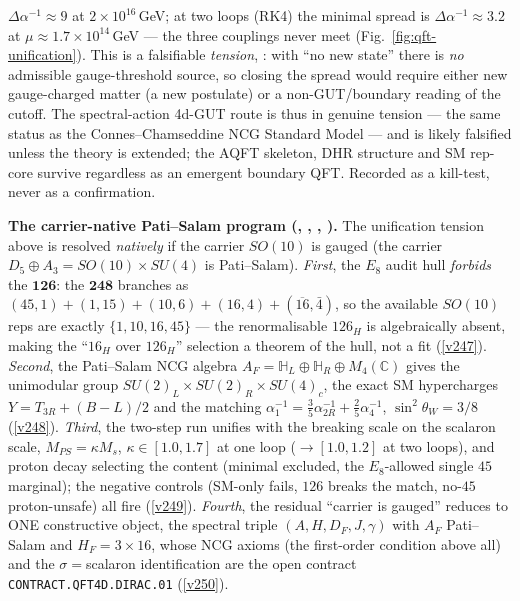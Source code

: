 \documentclass[11pt,a4paper]{article}
\begin{document}
\begin{keybox}
$\Delta\alpha^{-1}\approx9$ at $2{\times}10^{16}$\,GeV; at two loops (RK4) the minimal spread is
$\Delta\alpha^{-1}\approx3.2$ at $\mu\approx1.7{\times}10^{14}$\,GeV --- the three couplings never meet
(Fig.~\ref{fig:qft-unification}). This is a falsifiable \emph{tension}, \mX: with ``no new state'' there is
\emph{no} admissible gauge-threshold source, so closing the spread would require either new gauge-charged
matter (a new postulate) or a non-GUT/boundary reading of the cutoff. The spectral-action 4d-GUT route is
thus in genuine tension --- the same status as the Connes--Chamseddine NCG Standard Model --- and is likely
falsified unless the theory is extended; the AQFT skeleton, DHR structure and SM rep-core survive regardless
as an emergent boundary QFT. Recorded as a kill-test, never as a confirmation.
\par\smallskip\noindent\textbf{The carrier-native Pati--Salam program
(, , ,
).} The unification tension above is resolved \emph{natively} if the
carrier $SO(10)$ is gauged (the carrier $D_5{\oplus}A_3 = SO(10){\times}SU(4)$ is Pati--Salam). \emph{First},
the $E_8$ audit hull \emph{forbids} the $\mathbf{126}$: the $\mathbf{248}$ branches as
$(45,1){+}(1,15){+}(10,6){+}(16,4){+}(\overline{16},\bar4)$, so the available $SO(10)$ reps are exactly
$\{1,10,16,45\}$ --- the renormalisable $126_H$ is algebraically absent, making the
``$16_H$ over $126_H$'' selection a theorem of the hull, not a fit (\vref{v247}). \emph{Second}, the
Pati--Salam NCG algebra $A_F=\mathbb H_L\oplus\mathbb H_R\oplus M_4(\mathbb C)$ gives the unimodular group
$SU(2)_L{\times}SU(2)_R{\times}SU(4)_c$, the exact SM hypercharges $Y=T_{3R}+(B{-}L)/2$ and the matching
$\alpha_1^{-1}=\tfrac35\alpha_{2R}^{-1}+\tfrac25\alpha_4^{-1}$, $\sin^2\theta_W=3/8$ (\vref{v248}).
\emph{Third}, the two-step run unifies with the breaking scale on the scalaron scale, $M_{PS}=\kappa M_s$,
$\kappa\in[1.0,1.7]$ at one loop ($\to[1.0,1.2]$ at two loops), and proton decay selecting the content
(minimal excluded, the $E_8$-allowed single $45$ marginal); the negative controls (SM-only fails, $126$
breaks the match, no-$45$ proton-unsafe) all fire (\vref{v249}). \emph{Fourth}, the residual ``carrier is
gauged'' reduces to ONE constructive object, the spectral triple $(A,H,D_F,J,\gamma)$ with $A_F$
Pati--Salam and $H_F=3{\times}16$, whose NCG axioms (the first-order condition above all) and the
$\sigma=$scalaron identification are the open contract \texttt{CONTRACT.QFT4D.DIRAC.01} (\vref{v250}).

\end{keybox}
\end{document}
